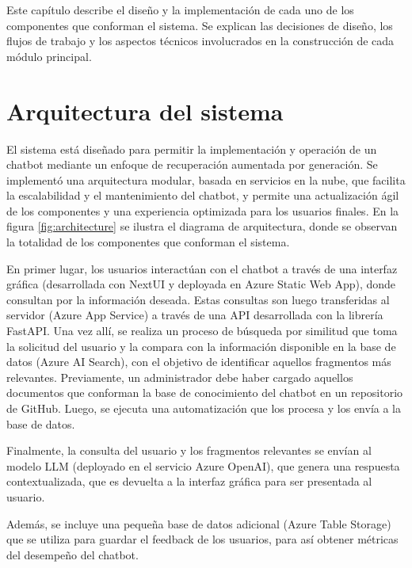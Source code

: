 
Este capítulo describe el diseño y la implementación de cada uno de los componentes que conforman el sistema.
Se explican las decisiones de diseño, los flujos de trabajo y los aspectos técnicos involucrados en la construcción de cada módulo principal.

\section{Arquitectura del sistema}

El sistema está diseñado para permitir la implementación y operación de un chatbot mediante un enfoque de recuperación aumentada por generación. 
Se implementó una arquitectura modular, basada en servicios en la nube, que facilita la escalabilidad y el mantenimiento del chatbot, y permite 
una actualización ágil de los componentes y una experiencia optimizada para los usuarios finales. En la figura \ref{fig:architecture} se ilustra
el diagrama de arquitectura, donde se observan la totalidad de los componentes que conforman el sistema.

En primer lugar, los usuarios interactúan con el chatbot a través de una interfaz gráfica (desarrollada con NextUI y deployada en Azure Static Web App), 
donde consultan por la información deseada. Estas consultas son luego transferidas al servidor (Azure App Service) a través de una API desarrollada 
con la librería FastAPI. Una vez allí, se realiza un proceso de búsqueda por similitud que toma la solicitud del usuario y la compara con la información
disponible en la base de datos (Azure AI Search), con el objetivo de identificar aquellos fragmentos más relevantes. Previamente, un administrador
debe haber cargado aquellos documentos que conforman la base de conocimiento del chatbot en un repositorio de GitHub. Luego, se ejecuta una 
automatización que los procesa y los envía a la base de datos.

Finalmente, la consulta del usuario y los fragmentos relevantes se envían al modelo LLM (deployado en el servicio Azure OpenAI), que genera una 
respuesta contextualizada, que es devuelta a la interfaz gráfica para ser presentada al usuario.

Además, se incluye una pequeña base de datos adicional (Azure Table Storage) que se utiliza para guardar el feedback de los usuarios, 
para así obtener métricas del desempeño del chatbot.  

